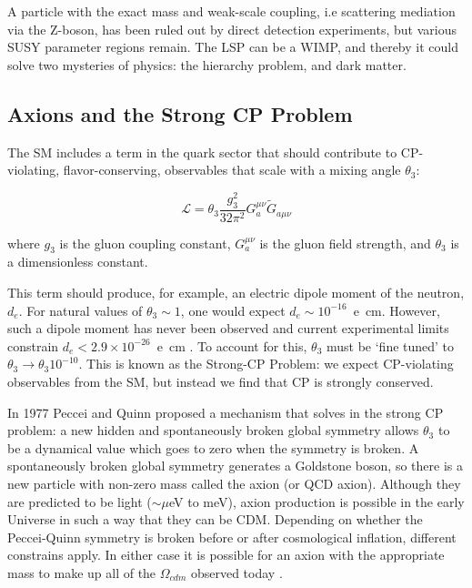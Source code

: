 A particle with the exact mass and weak-scale coupling, i.e scattering mediation via the Z-boson, has been ruled out by direct detection experiments, but various \ac{SUSY} parameter regions remain. The \ac{LSP} can be a \ac{WIMP}, and thereby it could solve two mysteries of physics: the hierarchy problem, and dark matter. 

\subsection{Axions and the Strong CP Problem}
\label{sec:axion}
The \ac{SM} includes a term in the quark sector that should contribute to CP-violating, flavor-conserving, observables that scale with a mixing angle $\theta_{3}$:

\begin{equation}
\mathcal{L} = \theta_{3} \frac{g_{3}^{2}}{32 \pi^{2}} G^{\mu \nu}_{a} \tilde{G}_{a \mu \nu}
\end{equation}

where $g_{3}$ is the gluon coupling constant, $G^{\mu \nu}_{a}$ is the gluon field strength, and $\theta_{3}$ is a dimensionless constant.

This term should produce, for example, an electric dipole moment of the neutron, $d_{e}$. For natural values of $\theta_{3} \sim 1$,  one would expect $d_{e} \sim10^{-16}$~e~cm. However, such a dipole moment has never been observed and current experimental limits constrain $d_{e} < 2.9 \times 10^{-26}$~e~cm \cite{Feng2010}. To account for this, $\theta_{3}$ must be `fine tuned' to $\theta_{3} \longrightarrow \theta_{3}10^{-10}$. This is known as the Strong-CP Problem: we expect CP-violating observables from the \ac{SM}, but instead we find that CP is strongly conserved.

In 1977 Peccei and Quinn proposed a mechanism that solves in the strong CP problem: a new hidden and spontaneously broken global symmetry allows $\theta_{3}$ to be a dynamical value which goes to zero when the symmetry is broken. A spontaneously broken global symmetry generates a Goldstone boson, so there is a new particle with non-zero mass called the axion (or QCD axion). Although they are predicted to be light ($\sim \mu$eV to meV), axion production is possible in the early Universe in such a way that they can be \ac{CDM}. Depending on whether the Peccei-Quinn symmetry is broken before or after cosmological inflation, different constrains apply. In either case it is possible for an axion with the appropriate mass to make up all of the $\Omega_{cdm}$ observed today \cite{PDGAxions2017}.


